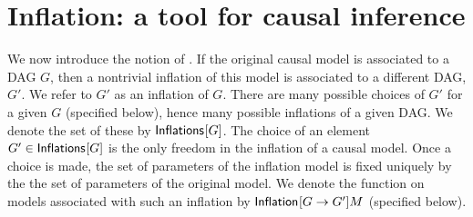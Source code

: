 
\section{Inflation: a tool for causal inference}

We now introduce the notion of .  %
If the original causal model is associated to a DAG $G$, then a nontrivial inflation of this model is associated to a different DAG, $G'$.  
We refer to $G'$ as an inflation of $G$.  There are many possible choices of $G'$ for a given $G$ (specified below), hence many possible inflations of a given DAG.  We denote the set of these by ${\operatorname{\mathsf{Inflations}}_{}}\lbrack G\rbrack$.   The choice of an element $G'\in {\operatorname{\mathsf{Inflations}}_{}}\lbrack G\rbrack$ is the only freedom in the inflation of a causal model.  Once a choice is made, the set of parameters of the inflation model is fixed uniquely by the the set of parameters of the original model.  We denote the function on models associated with such an inflation by ${\operatorname{\mathsf{Inflation}}_{}}\lbrack G\to G'\rbrack{M}$ (specified below).



